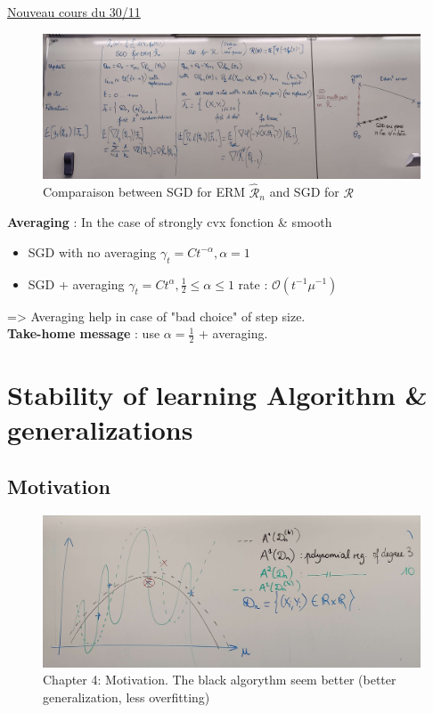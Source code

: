 \underline{Nouveau cours du 30/11} \\

\begin{figure}[!h]
    \centering
    \includegraphics[width=.95\textwidth]{figs/sum_up_SGD_table.jpg}
    \caption{Comparaison between SGD for ERM $\hat{\mathcal{R}}_n$ and SGD for $\mathcal{R}$ }
\end{figure}

\textbf{Averaging} : In the case of strongly cvx fonction \& smooth
\begin{itemize}
    \item SGD with no averaging $ \gamma _t = Ct^{- \alpha }, \alpha =1 $
    \item SGD + averaging $ \gamma _t = C t^\alpha , \frac{1}{2} \leq \alpha \leq 1 $ rate : $ \mathcal{O} (t^{-1} \mu ^{-1} ) $ 
\end{itemize}

=> Averaging help in case of "bad choice" of step size. \\
\textbf{Take-home message} : use $\alpha  = \frac{1}{2}$ + averaging.


\chapter{Stability of learning Algorithm \& generalizations}

\section{Motivation}
\begin{figure}[!h]
    \centering
    \includegraphics[width=.8\textwidth]{figs/chapter_4_motivation.jpg}
    \caption{Chapter 4: Motivation. The black algorythm seem better (better generalization, less overfitting) }
\end{figure}


